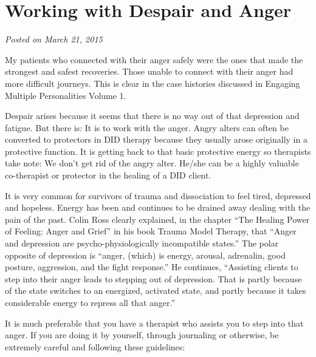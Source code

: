 \documentclass[]{book}
\begin{document}
\hypertarget{working-with-despair-and-anger}{%
\section{Working with Despair and Anger}\label{working-with-despair-and-anger}}

\emph{Posted on March 21, 2015}

My patients who connected with their anger safely were the ones that made the strongest and safest recoveries. Those unable to connect with their anger had more difficult journeys. This is clear in the case histories discussed in Engaging Multiple Personalities Volume 1.

Despair arises because it seems that there is no way out of that depression and fatigue. But there is: It is to work with the anger. Angry alters can often be converted to protectors in DID therapy because they usually arose originally in a protective function. It is getting back to that basic protective energy so therapists take note: We don't get rid of the angry alter. He/she can be a highly valuable co-therapist or protector in the healing of a DID client.

It is very common for survivors of trauma and dissociation to feel tired, depressed and hopeless. Energy has been and continues to be drained away dealing with the pain of the past. Colin Ross clearly explained, in the chapter ``The Healing Power of Feeling: Anger and Grief'' in his book Trauma Model Therapy, that ``Anger and depression are psycho-physiologically incompatible states.'' The polar opposite of depression is ``anger, (which) is energy, arousal, adrenalin, good posture, aggression, and the fight response.'' He continues, ``Assisting clients to step into their anger leads to stepping out of depression. That is partly because of the state switches to an energized, activated state, and partly because it takes considerable energy to repress all that anger.''

It is much preferable that you have a therapist who assists you to step into that anger. If you are doing it by yourself, through journaling or otherwise, be extremely careful and following these guidelines:
\end{document}
